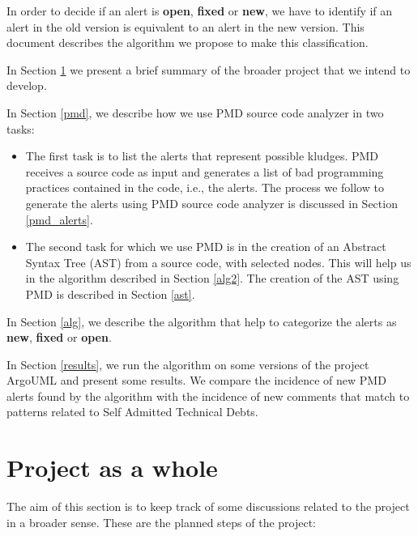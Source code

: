 \documentclass[
]{article}
\begin{document}
In order to decide if an alert is \textbf{open}, \textbf{fixed} or
\textbf{new}, we have to identify if an alert in the old version is
equivalent to an alert in the new version. This document describes the
algorithm we propose to make this classification.

In Section \ref{as_whole} we present a brief summary of the broader
project that we intend to develop.

In Section \ref{pmd}, we describe how we use PMD source code analyzer in
two tasks:

\begin{itemize}
\item The first task is to list the alerts that represent possible kludges. 
PMD receives a source code as input and generates a list of bad programming practices contained in the code, i.e., the alerts. 
The process we follow to generate the alerts using PMD source code analyzer is discussed in Section \ref{pmd_alerts}. 
\item The second task for which we use PMD is in the creation of an Abstract Syntax Tree (AST) from a source code, with selected nodes. 
This will help us in the algorithm described in Section \ref{alg2}. 
The creation of the AST using PMD is described in Section \ref{ast}.
\end{itemize}

In Section \ref{alg}, we describe the algorithm that help to categorize
the alerts as \textbf{new}, \textbf{fixed} or \textbf{open}.

In Section \ref{results}, we run the algorithm on some versions of the
project ArgoUML and present some results. We compare the incidence of
new PMD alerts found by the algorithm with the incidence of new comments
that match to patterns related to Self Admitted Technical Debts.

\section{Project as a whole}\label{as_whole}

The aim of this section is to keep track of some discussions related to
the project in a broader sense. These are the planned steps of the
project:
\end{document}
